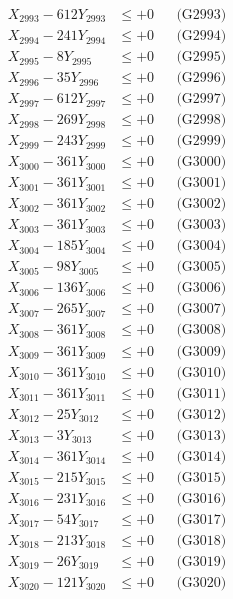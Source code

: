 \documentclass[a4paper,10pt]{article}
\begin{document}
{\begin{align}
X_{2993} - 612Y_{2993} &\leq +0 && \text{(G2993)} \\
X_{2994} - 241Y_{2994} &\leq +0 && \text{(G2994)} \\
X_{2995} - 8Y_{2995} &\leq +0 && \text{(G2995)} \\
X_{2996} - 35Y_{2996} &\leq +0 && \text{(G2996)} \\
X_{2997} - 612Y_{2997} &\leq +0 && \text{(G2997)} \\
X_{2998} - 269Y_{2998} &\leq +0 && \text{(G2998)} \\
X_{2999} - 243Y_{2999} &\leq +0 && \text{(G2999)} \\
X_{3000} - 361Y_{3000} &\leq +0 && \text{(G3000)} \\
\allowbreak
X_{3001} - 361Y_{3001} &\leq +0 && \text{(G3001)} \\
X_{3002} - 361Y_{3002} &\leq +0 && \text{(G3002)} \\
X_{3003} - 361Y_{3003} &\leq +0 && \text{(G3003)} \\
X_{3004} - 185Y_{3004} &\leq +0 && \text{(G3004)} \\
X_{3005} - 98Y_{3005} &\leq +0 && \text{(G3005)} \\
X_{3006} - 136Y_{3006} &\leq +0 && \text{(G3006)} \\
X_{3007} - 265Y_{3007} &\leq +0 && \text{(G3007)} \\
X_{3008} - 361Y_{3008} &\leq +0 && \text{(G3008)} \\
X_{3009} - 361Y_{3009} &\leq +0 && \text{(G3009)} \\
X_{3010} - 361Y_{3010} &\leq +0 && \text{(G3010)} \\
\allowbreak
X_{3011} - 361Y_{3011} &\leq +0 && \text{(G3011)} \\
X_{3012} - 25Y_{3012} &\leq +0 && \text{(G3012)} \\
X_{3013} - 3Y_{3013} &\leq +0 && \text{(G3013)} \\
X_{3014} - 361Y_{3014} &\leq +0 && \text{(G3014)} \\
X_{3015} - 215Y_{3015} &\leq +0 && \text{(G3015)} \\
X_{3016} - 231Y_{3016} &\leq +0 && \text{(G3016)} \\
X_{3017} - 54Y_{3017} &\leq +0 && \text{(G3017)} \\
X_{3018} - 213Y_{3018} &\leq +0 && \text{(G3018)} \\
X_{3019} - 26Y_{3019} &\leq +0 && \text{(G3019)} \\
X_{3020} - 121Y_{3020} &\leq +0 && \text{(G3020)} \\

\end{align}}
\end{document}

